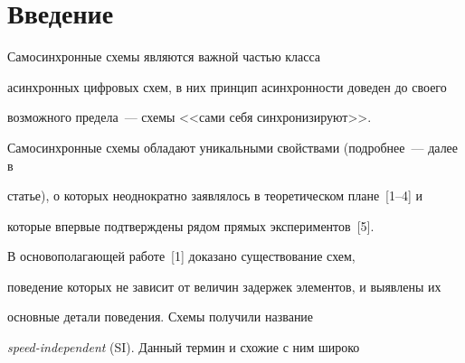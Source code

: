     















      \thispagestyle{headings}





      


            \label{st\stat}


            


            \vspace*{-12pt}


      


      


      \section{Введение}


      


      Самосинхронные схемы  являются важной частью класса 


асинхронных цифровых схем, в них принцип асинхронности доведен до своего 


возможного предела~--- схемы <<сами себя синхронизируют>>.


      


      Самосинхронные схемы обладают уникальными свойствами (подробнее~--- далее в 


статье), о которых неоднократно заявлялось в теоретическом плане~[1--4] и 


которые впервые подтверждены рядом прямых экспериментов~[5].


      


      В основополагающей работе~[1] доказано существование схем, 


поведение которых не зависит от величин задержек элементов, и выявлены их 


основные детали поведения. Схемы получили название 


      \textit{speed-independent} (SI). Данный термин и схожие с ним широко 


